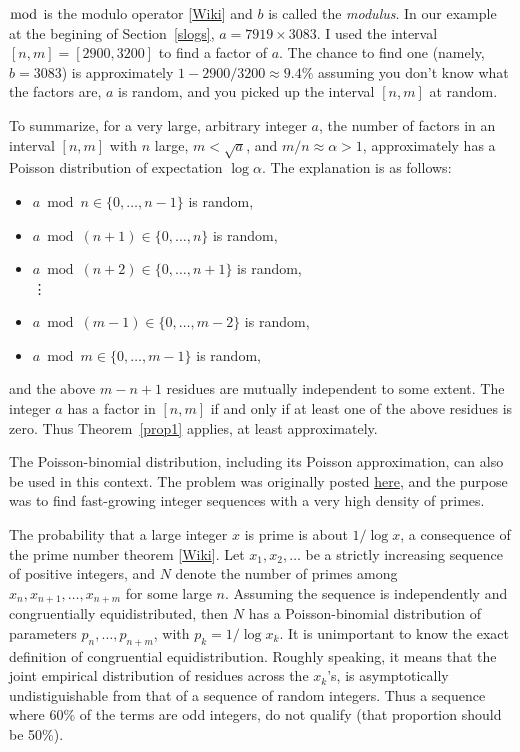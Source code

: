 \documentclass[10pt]{article}
\begin{document}
$\bmod$ is the modulo operator [\href{https://en.wikipedia.org/wiki/Modulo_operation}{Wiki}] and $b$ is called the {\em modulus}. In our example at the begining of Section~\ref{slogs}, $a=7919 \times 3083$.
 I used the interval $[n,m]=[2900,3200]$ to find a factor of $a$. The chance to find one (namely, $b=3083$) is approximately $1-2900/3200\approx 9.4\%$ assuming you don't know what the factors are, $a$ is random, and you picked up the interval $[n,m]$ at random.

To summarize, for a very large, arbitrary integer $a$, the number of factors in an interval $[n, m]$ with $n$ large, $m<\sqrt{a}$, and $m/n\approx\alpha>1$, approximately has a Poisson distribution of expectation $\log\alpha$. The explanation is as follows:
\begin{itemize}
\item $a \bmod{n}\in \{0,\dots, n-1\}$ is random,
\item $a \bmod{(n+1)}\in \{0,\dots, n\}$ is random,
\item $a \bmod{(n+2)}\in \{0, \dots,n+1\}$ is random,\\
  \vdots
\item $a \bmod{(m-1)}\in \{0,\dots,m-2\}$ is random,
\item $a \bmod{m}\in \{0,\dots,m-1\}$ is random,
\end{itemize}
and the above $m-n+1$ residues are mutually independent to some extent. The integer $a$ has a factor in $[n,m]$ if and only if at least one of the above residues is zero. Thus Theorem~\ref{prop1} applies, at least approximately. \\


\noindent The Poisson-binomial distribution, including its Poisson approximation, can also be used in this context. The problem was originally posted \href{https://mathoverflow.net/questions/374305/sequences-with-high-densities-of-primes-how-to-boost-them-to-get-even-more-and}{here}, and the purpose was to find fast-growing integer sequences with a very high density of primes.

The probability that a large integer $x$ is prime is about $1/\log x$, a consequence of the prime number theorem [\href{https://en.wikipedia.org/wiki/Prime_number_theorem}{Wiki}]. Let
 $x_1,x_2,\dots$ be a strictly increasing sequence of positive integers, and $N$ denote the number of primes among $x_n,x_{n+1},\dots,x_{n+m}$ for some large $n$. Assuming the sequence is independently and congruentially equidistributed, then $N$ has a Poisson-binomial distribution of parameters $p_n,\dots,p_{n+m}$, with $p_k=1/\log x_k$. It is unimportant to know the exact definition of congruential equidistribution. Roughly speaking, it means that the joint empirical distribution of residues across the $x_k$'s, is asymptotically undistiguishable from that of a sequence of random integers. Thus a sequence where 60\% of the terms are odd integers, do not qualify (that proportion should be 50\%).
\end{document}
